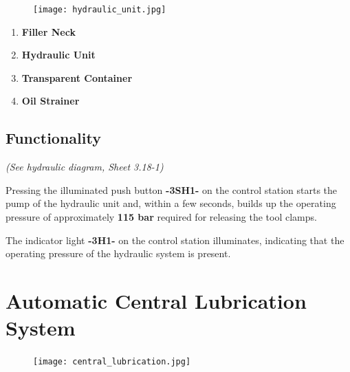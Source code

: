 \setcounter{page}{3}

\begin{figure}[h]
    \centering
    \texttt{[image: hydraulic\_unit.jpg]}
    \label{fig:maho_hydraulic_unit}
\end{figure}

\begin{enumerate}
    \item \textbf{Filler Neck} \footnotemark
    \item \textbf{Hydraulic Unit}
    \item \textbf{Transparent Container}
    \item \textbf{Oil Strainer}
\end{enumerate}



\subsection{Functionality}  \footnotemark
{}

\textit{(See hydraulic diagram, Sheet 3.18-1)}

\noindent Pressing the illuminated push button \textbf{-3SH1-} on the control station starts the  
pump of the hydraulic unit and, within a few seconds, builds up the operating  
pressure of approximately \textbf{115 bar} required for releasing the tool clamps.  

\vspace{0.3cm}

\noindent The indicator light \textbf{-3H1-} on the control station illuminates, indicating  
that the operating pressure of the hydraulic system is present.

\section{Automatic Central Lubrication System}

\setcounter{section}{20}

\begin{figure}[h]
    \centering
    \texttt{[image: central\_lubrication.jpg]}
    \label{fig:maho_central_lubrication}
\end{figure}

